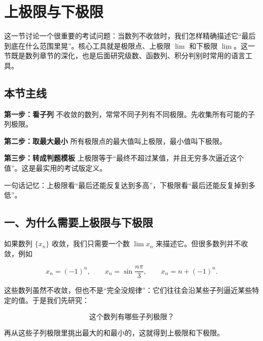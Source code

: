 \section{上极限与下极限}

这一节讨论一个很重要的考试问题：当数列不收敛时，我们怎样精确描述它“最后到底在什么范围里晃”。核心工具就是极限点、上极限 \(\overline{\lim}\) 和下极限 \(\underline{\lim}\)。这一节既是数列章节的深化，也是后面研究级数、函数列、积分判别时常用的语言工具。

\subsection*{本节主线}

\begin{conceptbox}
\textbf{第一步：看子列}
不收敛的数列，常常不同子列有不同极限。先收集所有可能的子列极限。
\end{conceptbox}

\begin{conceptbox}
\textbf{第二步：取最大最小}
所有极限点的最大值叫上极限，最小值叫下极限。
\end{conceptbox}

\begin{conceptbox}
\textbf{第三步：转成判题模板}
上极限等于“最终不超过某值，并且无穷多次逼近这个值”。这是最实用的考试版定义。
\end{conceptbox}

\begin{notebox}
一句话记忆：上极限看“最后还能反复达到多高”，下极限看“最后还能反复掉到多低”。
\end{notebox}

\subsection*{一、为什么需要上极限与下极限}

如果数列 \(\{x_n\}\) 收敛，我们只需要一个数 \(\lim x_n\) 来描述它。但很多数列并不收敛，例如

\[
      x_n=(-1)^n,\qquad
      x_n=\sin\frac{n\pi}{3},\qquad
      x_n=n+(-1)^n.
    \]

这些数列虽然不收敛，但也不是“完全没规律”：它们往往会沿某些子列逼近某些特定的值。于是我们先研究：

\[
      \text{这个数列有哪些子列极限？}
    \]

再从这些子列极限里挑出最大的和最小的，这就得到上极限和下极限。


